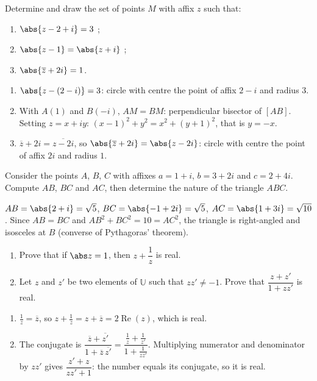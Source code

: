 \begin{exercise}
Determine and draw the set of points $M$ with affix $z$ such that:
\begin{enumerate}
\item $\abs{z-2+i}=3$ ;
\item $\abs{z-1}=\abs{z+i}$ ;
\item $\abs{\overline z+2i}=1$.
\end{enumerate}
\end{exercise}
\begin{solution}
\begin{enumerate}
\item $\abs{z-(2-i)}=3$: circle with centre the point of affix $2-i$ and radius $3$.
\item With $A(1)$ and $B(-i)$, $AM=BM$: perpendicular bisector of $[AB]$. Setting $z=x+iy$: $(x-1)^2+y^2=x^2+(y+1)^2$, that is $y=-x$.
\item $\overline z+2i=\overline{z-2i}$, so $\abs{\overline z+2i}=\abs{z-2i}$: circle with centre the point of affix $2i$ and radius $1$.
\end{enumerate}
\end{solution}

\begin{exercise}
Consider the points $A$, $B$, $C$ with affixes $a=1+i$, $b=3+2i$ and $c=2+4i$. Compute $AB$, $BC$ and $AC$, then determine the nature of the triangle $ABC$.
\end{exercise}
\begin{solution}
$AB=\abs{2+i}=\sqrt5$, $BC=\abs{-1+2i}=\sqrt5$, $AC=\abs{1+3i}=\sqrt{10}$. Since $AB=BC$ and $AB^2+BC^2=10=AC^2$, the triangle is right-angled and isosceles at $B$ (converse of Pythagoras' theorem).
\end{solution}

\begin{exercise}
\begin{enumerate}
\item Prove that if $\abs z=1$, then $z+\dfrac1z$ is real.
\item Let $z$ and $z'$ be two elements of $\mathbb U$ such that $zz'\neq-1$. Prove that $\dfrac{z+z'}{1+zz'}$ is real.
\end{enumerate}
\end{exercise}
\begin{solution}
\begin{enumerate}
\item $\frac1z=\overline z$, so $z+\frac1z=z+\overline z=2\operatorname{Re}(z)$, which is real.
\item The conjugate is $\dfrac{\overline z+\overline{z'}}{1+\overline z\,\overline{z'}}=\dfrac{\frac1z+\frac1{z'}}{1+\frac1{zz'}}$. Multiplying numerator and denominator by $zz'$ gives $\dfrac{z'+z}{zz'+1}$: the number equals its conjugate, so it is real.
\end{enumerate}
\end{solution}

